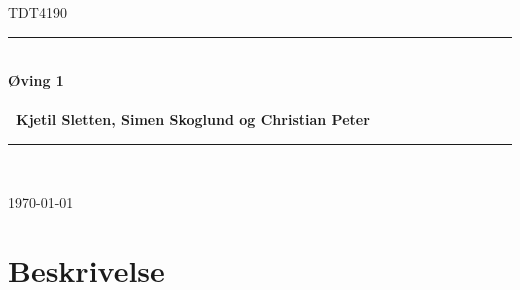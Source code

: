 \documentclass[11pt, a4paper]{article}	%
\begin{document}
\begin{titlepage}
\newcommand{\HRule}{\rule{\linewidth}{0.5mm}}
 
\begin{center}
 

\textsc{\huge TDT4190 }\\[2.0cm]

 
\HRule \\[0.3cm]
{\huge \bfseries  Øving  1
\\\ \\\ \LARGE Kjetil Sletten, Simen Skoglund og Christian Peter }\\[0.4cm]
\HRule \\[1.5cm]
 
\vfill
 
{\large \today}
 
\end{center}
\end{titlepage}

\newpage

\section{Beskrivelse}


\newpage
\begin{thebibliography}{2}


\end{thebibliography}
\end{document}
